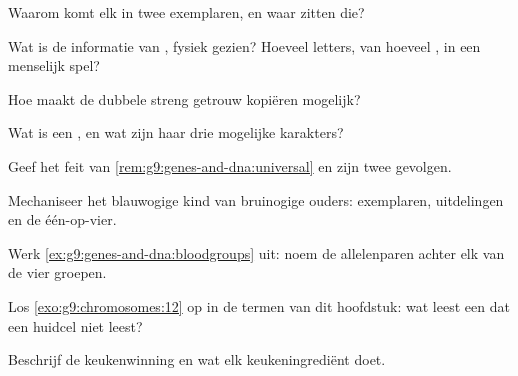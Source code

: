 \begin{exercise}[$\star$]\label{exo:g9:genes-and-dna:2}
Waarom komt elk  in twee exemplaren, en waar zitten die?
\end{exercise}

\begin{exercise}[$\star$]\label{exo:g9:genes-and-dna:3}
Wat is de informatie van , fysiek gezien? Hoeveel letters,
van hoeveel , in een menselijk spel?
\end{exercise}

\begin{exercise}[$\star$]\label{exo:g9:genes-and-dna:4}
Hoe maakt de dubbele streng getrouw kopiëren mogelijk?
\end{exercise}

\begin{exercise}[$\star$]\label{exo:g9:genes-and-dna:5}
Wat is een , en wat zijn haar drie mogelijke
karakters?
\end{exercise}

\begin{exercise}[$\star$]\label{exo:g9:genes-and-dna:6}
Geef het feit van \cref{rem:g9:genes-and-dna:universal} en zijn
twee gevolgen.
\end{exercise}

\begin{exercise}[$\star\star$]\label{exo:g9:genes-and-dna:7}
Mechaniseer het blauwogige kind van bruinogige ouders:
exemplaren, uitdelingen en de één-op-vier.
\end{exercise}

\begin{exercise}[$\star\star$]\label{exo:g9:genes-and-dna:8}
Werk \cref{ex:g9:genes-and-dna:bloodgroups} uit: noem de
allelenparen achter elk van de vier groepen.
\end{exercise}

\begin{exercise}[$\star\star$]\label{exo:g9:genes-and-dna:9}
Los \cref{exo:g9:chromosomes:12} op in de termen van dit
hoofdstuk: wat leest een  dat een huidcel niet
leest?
\end{exercise}

\begin{exercise}[$\star\star$]\label{exo:g9:genes-and-dna:10}
Beschrijf de keukenwinning en wat elk keukeningrediënt doet.
\end{exercise}

